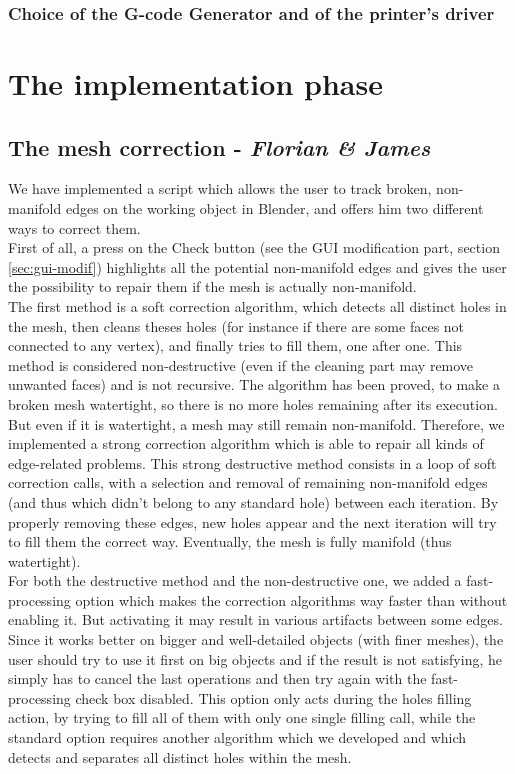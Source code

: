 \documentclass{report}
\begin{document}
\subsection{Choice of the G-code Generator and of the printer's driver}

\chapter{The implementation phase}

\section{The mesh correction - \textit{Florian \& James}}

We have implemented a script which allows the user to track broken, non-manifold edges on the working object in Blender, and offers him two different ways to correct them.\\

First of all, a press on the Check button (see the GUI modification part, section \ref{sec:gui-modif}) highlights all the potential non-manifold edges and gives the user the possibility to repair them if the mesh is actually non-manifold.\\

The first method is a soft correction algorithm, which detects all distinct holes in the mesh, then cleans theses holes (for instance if there are some faces not connected to any vertex), and finally tries to fill them, one after one. This method is considered non-destructive (even if the cleaning part may remove unwanted faces) and is not recursive. The algorithm has been proved, to make a broken mesh watertight, so there is no more holes remaining after its execution.\\

But even if it is watertight, a mesh may still remain non-manifold. Therefore, we implemented a strong correction algorithm which is able to repair all kinds of edge-related problems. This strong destructive method consists in a loop of soft correction calls, with a selection and removal of remaining non-manifold edges (and thus which didn't belong to any standard hole) between each iteration. By properly removing these edges, new holes appear and the next iteration will try to fill them the correct way. Eventually, the mesh is fully manifold (thus watertight).\\

For both the destructive method and the non-destructive one, we added a fast-processing option which makes the correction algorithms way faster than without enabling it. But activating it may result in various artifacts between some edges. Since it works better on bigger and well-detailed objects (with finer meshes), the user should try to use it first on big objects and if the result is not satisfying, he simply has to cancel the last operations and then try again with the fast-processing check box disabled. This option only acts during the holes filling action, by trying to fill all of them with only one single filling call, while the standard option requires another algorithm which we developed and which detects and separates all distinct holes within the mesh.
\end{document}

